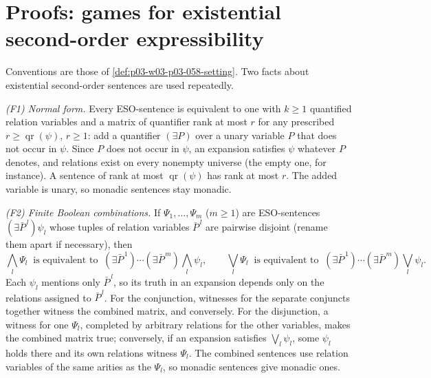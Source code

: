 \section{Proofs: games for existential second-order expressibility}
\label{sec:annex-p03-w03-p03-058-eso-games}

Conventions are those of \cref{def:p03-w03-p03-058-setting}. Two facts about
existential second-order sentences are used repeatedly.

\emph{(F1) Normal form.} Every ESO-sentence is equivalent to one with
\(k\ge1\) quantified relation variables and a matrix of quantifier rank at
most \(r\) for any prescribed \(r\ge\operatorname{qr}(\psi)\), \(r\ge1\):
add a quantifier \((\exists P)\) over a unary variable \(P\) that does not
occur in \(\psi\). Since \(P\) does not occur in \(\psi\), an expansion
satisfies \(\psi\) whatever \(P\) denotes, and relations exist on every
nonempty universe (the empty one, for instance). A sentence of rank at most
\(\operatorname{qr}(\psi)\) has rank at most \(r\). The added variable is
unary, so monadic sentences stay monadic.

\emph{(F2) Finite Boolean combinations.} If \(\Psi_1,\ldots,\Psi_m\)
(\(m\ge1\)) are ESO-sentences \((\exists\bar P^{\,l})\psi_l\) whose tuples of
relation variables \(\bar P^{\,l}\) are pairwise disjoint (rename them apart
if necessary), then
\[
 \textstyle\bigwedge_l\Psi_l\ \text{ is equivalent to }\
 (\exists\bar P^{\,1})\cdots(\exists\bar P^{\,m})\bigwedge_l\psi_l,
 \qquad
 \bigvee_l\Psi_l\ \text{ is equivalent to }\
 (\exists\bar P^{\,1})\cdots(\exists\bar P^{\,m})\bigvee_l\psi_l .
\]
Each \(\psi_l\) mentions only \(\bar P^{\,l}\), so its truth in an expansion
depends only on the relations assigned to \(\bar P^{\,l}\). For the
conjunction, witnesses for the separate conjuncts together witness the
combined matrix, and conversely. For the disjunction, a witness for one
\(\Psi_l\), completed by arbitrary relations for the other variables, makes
the combined matrix true; conversely, if an expansion satisfies
\(\bigvee_l\psi_l\), some \(\psi_l\) holds there and its own relations
witness \(\Psi_l\). The combined sentences use relation variables of the
same arities as the \(\Psi_l\), so monadic sentences give monadic ones.


